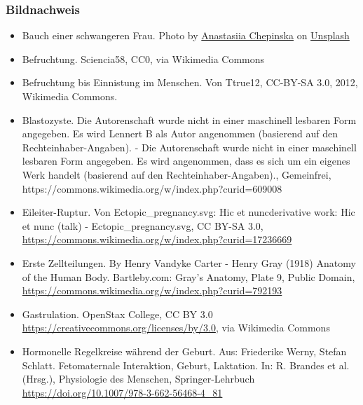 \documentclass{beamer}
\begin{document}
\begin{frame}
\frametitle{Bildnachweis}

\begin{tiny}
 
\begin{itemize}


\item
Bauch einer schwangeren Frau. Photo by \href{https://unsplash.com/es/@anastasiiachepinska?utm_source=unsplash&utm_medium=referral&utm_content=creditCopyText}{Anastasiia Chepinska} on \href{https://unsplash.com/s/photos/pregnancy?utm_source=unsplash&utm_medium=referral&utm_content=creditCopyText}{Unsplash}

\item
Befruchtung. Sciencia58, CC0, via Wikimedia Commons


\item
Befruchtung bis Einnistung im Menschen. Von Ttrue12, CC-BY-SA 3.0, 2012, Wikimedia Commons. 

\item
Blastozyste. Die Autorenschaft wurde nicht in einer maschinell lesbaren Form angegeben. Es wird Lennert B als Autor angenommen (basierend auf den Rechteinhaber-Angaben). - Die Autorenschaft wurde nicht in einer maschinell lesbaren Form angegeben. Es wird angenommen, dass es sich um ein eigenes Werk handelt (basierend auf den Rechteinhaber-Angaben)., Gemeinfrei, https://commons.wikimedia.org/w/index.php?curid=609008

\item
Eileiter-Ruptur. Von Ectopic\_pregnancy.svg: Hic et nuncderivative work: Hic et nunc (talk) - Ectopic\_pregnancy.svg, CC BY-SA 3.0, \url{https://commons.wikimedia.org/w/index.php?curid=17236669}

\item

Erste Zellteilungen. By Henry Vandyke Carter - Henry Gray (1918) Anatomy of the Human Body. Bartleby.com: Gray's Anatomy, Plate 9, Public Domain, \url{https://commons.wikimedia.org/w/index.php?curid=792193}

 \item
    Gastrulation. OpenStax College, CC BY 3.0 \url{https://creativecommons.org/licenses/by/3.0}, via Wikimedia Commons
\item
Hormonelle Regelkreise während der Geburt. Aus: Friederike Werny, Stefan Schlatt. Fetomaternale Interaktion, Geburt, Laktation. In: R. Brandes et al. (Hrsg.), Physiologie des Menschen, Springer-Lehrbuch \url{https://doi.org/10.1007/978-3-662-56468-4_81}



\end{itemize}
\end{tiny}
\end{frame}
\end{document}
